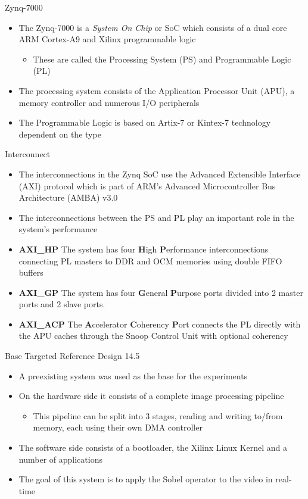 \documentclass{beamer}
\begin{document}
\begin{frame}{Zynq-7000}
  \begin{itemize}
  \item The Zynq-7000 is a \emph{System On Chip} or SoC which consists
    of a dual core ARM Cortex-A9 and Xilinx programmable logic
    \begin{itemize}
    \item These are called the Processing System (PS) and Programmable
      Logic (PL)
    \end{itemize}
  \item The processing system consists of the Application Processor
    Unit (APU), a memory controller and numerous I/O peripherals
  \item The Programmable Logic is based on Artix-7 or Kintex-7
    technology dependent on the type
  \end{itemize}
\end{frame}

\begin{frame}{Interconnect}
  \begin{itemize}
  \item The interconnections in the Zynq SoC use the Advanced
    Extensible Interface (AXI) protocol which is part of ARM's
    Advanced Microcontroller Bus Architecture (AMBA) v3.0
  \item The interconnections between the PS and PL play an important
    role in the system's performance
  \item \textbf{AXI\_HP} The system has four \textbf{H}igh
    \textbf{P}erformance interconnections connecting PL masters to DDR
    and OCM memories using double FIFO buffers
  \item \textbf{AXI\_GP} The system has four \textbf{G}eneral
    \textbf{P}urpose ports divided into 2 master ports and 2 slave
    ports.
  \item \textbf{AXI\_ACP} The \textbf{A}ccelerator \textbf{C}oherency
    \textbf{P}ort connects the PL directly with the APU caches through
    the Snoop Control Unit with optional coherency
  \end{itemize}
\end{frame}

\begin{frame}{Base Targeted Reference Design 14.5}
  \begin{itemize}
  \item A preexisting system was used as the base for the experiments
  \item On the hardware side it consists of a complete image
    processing pipeline
    \begin{itemize}
    \item This pipeline can be split into 3 stages, reading and
      writing to/from memory, each using their own DMA controller
    \end{itemize}
  \item The software side consists of a bootloader, the Xilinx Linux
    Kernel and a number of applications
  \item The goal of this system is to apply the Sobel operator to the video in real-time
  \end{itemize}
\end{frame}
\end{document}
